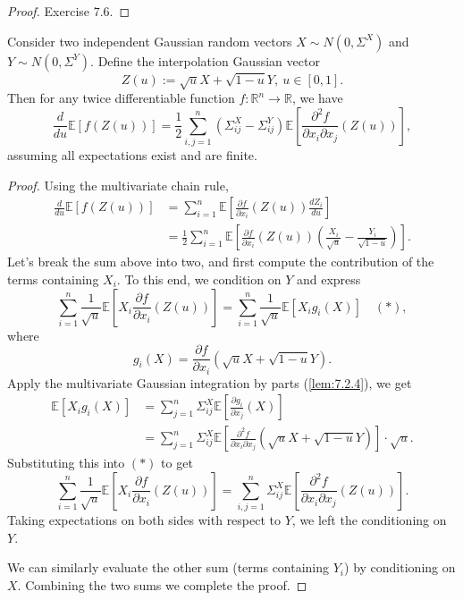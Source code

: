 \begin{proof}
Exercise 7.6.
\end{proof}

\begin{lemma}
\label{lem:7.2.5}
Consider two independent Gaussian random vectors $X \sim N(0, \Sigma^X)$ and $Y \sim N(0, \Sigma^Y)$. Define 
the interpolation Gaussian vector 
\[ Z(u) := \sqrt{u}X + \sqrt{1 - u}Y, \ u \in [0, 1]. \]
Then for any twice differentiable function $f: \mathbb{R}^n \to \mathbb{R}$, we have
\[ \frac{d}{du}\mathbb{E}\left[ f(Z(u)) \right] = \frac{1}{2}\sum_{i, j = 1}^{n}(\Sigma_{ij}^X - \Sigma_{ij}^Y) 
\mathbb{E}\left[ \frac{\partial^2 f}{\partial x_i \partial x_j}(Z(u)) \right], \]
assuming all expectations exist and are finite.
\end{lemma}

\begin{proof}
Using the multivariate chain rule, 
\begin{align*}
	\frac{d}{du}\mathbb{E}\left[ f(Z(u)) \right] 
	&= \sum_{i = 1}^{n} \mathbb{E}\left[ \frac{\partial f}{\partial x_i}(Z(u)) \frac{dZ_i}{du} \right] \\
	&= \frac{1}{2}\sum_{i = 1}^{n} \mathbb{E}\left[ \frac{\partial f}{\partial x_i}(Z(u)) 
	\left( \frac{X_i}{\sqrt{u}} - \frac{Y_i}{\sqrt{1 - u}} \right) \right].
\end{align*}
Let's break the sum above into two, and first compute the contribution of the terms containing $X_i$. To this 
end, we condition on $Y$ and express 
\[ \sum_{i = 1}^{n}\frac{1}{\sqrt{u}} \mathbb{E}\left[ X_i \frac{\partial f}{\partial x_i}(Z(u)) \right] 
= \sum_{i = 1}^{n} \frac{1}{\sqrt{u}} \mathbb{E}\left[ X_i g_i(X) \right] \quad (*), \]
where 
\[ g_i(X) = \frac{\partial f}{\partial x_i}(\sqrt{u}X + \sqrt{1 - u}Y). \]
Apply the multivariate Gaussian integration by parts (\cref{lem:7.2.4}), we get 
\begin{align*}
	\mathbb{E}\left[ X_ig_i(X) \right] 
	&= \sum_{j = 1}^{n} \Sigma_{ij}^X \mathbb{E}\left[ \frac{\partial g_i}{\partial x_j}(X) \right] \\
	&= \sum_{j = 1}^{n} \Sigma_{ij}^X \mathbb{E}\left[ \frac{\partial^2 f}{\partial x_i \partial x_j} 
	(\sqrt{u}X + \sqrt{1 - u}Y) \right] \cdot \sqrt{u}.
\end{align*}
Substituting this into $(*)$ to get 
\[ \sum_{i = 1}^{n} \frac{1}{\sqrt{u}} \mathbb{E}\left[ X_i \frac{\partial f}{\partial x_i}(Z(u)) \right] 
= \sum_{i, j = 1}^{n} \Sigma_{ij}^X \mathbb{E}\left[ \frac{\partial^2 f}{\partial x_i \partial x_j}(Z(u))
\right]. \]
Taking expectations on both sides with respect to $Y$, we left the conditioning on $Y$. 

We can similarly evaluate the other sum (terms containing $Y_i$) by conditioning on $X$. Combining the two 
sums we complete the proof.
\end{proof}


